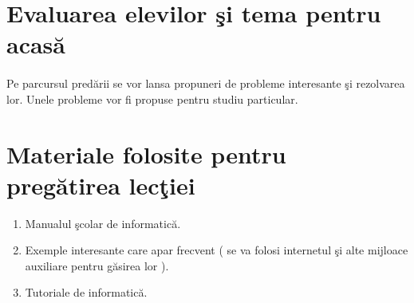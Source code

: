 \documentclass{article}
\begin{document}
\section{Evaluarea elevilor \c si tema pentru acas\u a }

\paragraph{}
Pe parcursul pred\u arii se vor lansa propuneri de probleme interesante \c si rezolvarea lor. Unele probleme vor fi propuse pentru studiu particular. 


\section{Materiale folosite pentru preg\u atirea lec\c tiei}

\begin{enumerate}
\item Manualul \c scolar de informatic\u a.
\item Exemple interesante care apar frecvent ( se va folosi internetul \c si alte mijloace auxiliare pentru g\u asirea lor ).
\item Tutoriale de informatic\u a.
\end{enumerate}
\end{document}
